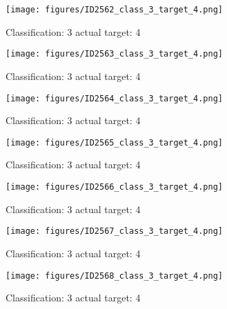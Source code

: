 \begin{figure}[h!]
\begin{center}
\texttt{[image: figures/ID2562\_class\_3\_target\_4.png]}
\end{center}
\caption{ Classification: 3 actual target: 4}
\label{fig:ID2562_class_3_target_4}
\end{figure}
\begin{figure}[h!]
\begin{center}
\texttt{[image: figures/ID2563\_class\_3\_target\_4.png]}
\end{center}
\caption{ Classification: 3 actual target: 4}
\label{fig:ID2563_class_3_target_4}
\end{figure}
\begin{figure}[h!]
\begin{center}
\texttt{[image: figures/ID2564\_class\_3\_target\_4.png]}
\end{center}
\caption{ Classification: 3 actual target: 4}
\label{fig:ID2564_class_3_target_4}
\end{figure}
\begin{figure}[h!]
\begin{center}
\texttt{[image: figures/ID2565\_class\_3\_target\_4.png]}
\end{center}
\caption{ Classification: 3 actual target: 4}
\label{fig:ID2565_class_3_target_4}
\end{figure}
\begin{figure}[h!]
\begin{center}
\texttt{[image: figures/ID2566\_class\_3\_target\_4.png]}
\end{center}
\caption{ Classification: 3 actual target: 4}
\label{fig:ID2566_class_3_target_4}
\end{figure}
\begin{figure}[h!]
\begin{center}
\texttt{[image: figures/ID2567\_class\_3\_target\_4.png]}
\end{center}
\caption{ Classification: 3 actual target: 4}
\label{fig:ID2567_class_3_target_4}
\end{figure}
\begin{figure}[h!]
\begin{center}
\texttt{[image: figures/ID2568\_class\_3\_target\_4.png]}
\end{center}
\caption{ Classification: 3 actual target: 4}
\label{fig:ID2568_class_3_target_4}
\end{figure}
